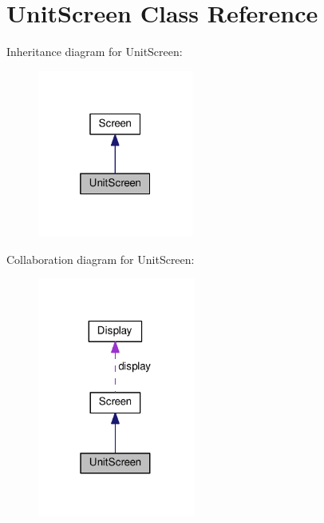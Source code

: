 \hypertarget{classUnitScreen}{}\section{Unit\+Screen Class Reference}
\label{classUnitScreen}


Inheritance diagram for Unit\+Screen\+:\nopagebreak
\begin{figure}[H]
\begin{center}
\leavevmode
\includegraphics[width=145pt]{classUnitScreen__inherit__graph}
\end{center}
\end{figure}


Collaboration diagram for Unit\+Screen\+:\nopagebreak
\begin{figure}[H]
\begin{center}
\leavevmode
\includegraphics[width=147pt]{classUnitScreen__coll__graph}
\end{center}
\end{figure}
